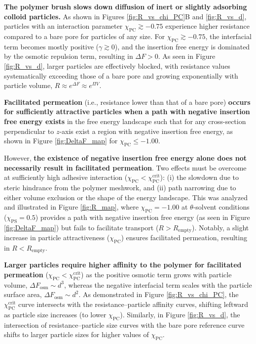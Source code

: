 \documentclass[12pt, a4paper]{article}
\begin{document}
\textbf{The polymer brush slows down diffusion of inert or slightly adsorbing colloid particles.}
As shown in Figures \ref{fig:R_vs_chi_PC}B and \ref{fig:R_vs_d}, particles with an interaction parameter $\chi_{\text{PC}} \gtrsim -0.75$ experience higher resistance compared to a bare pore for particles of any size.
For $\chi_{\text{PC}} \gtrsim -0.75$, the interfacial term becomes mostly positive ($\gamma \gtrsim 0$), and the insertion free energy is dominated by the osmotic repulsion term, resulting in $\Delta F > 0$.
As seen in Figure \ref{fig:R_vs_d}, larger particles are effectively blocked, with resistance values systematically exceeding those of a bare pore and growing exponentially with particle volume, $R \approx e^{\Delta F} \approx e^{\Pi V}$.

\textbf{Facilitated permeation} (i.e., resistance lower than that of a bare pore) \textbf{occurs for sufficiently attractive particles when a path with negative insertion free energy exists} in the free energy landscape such that for any cross-section perpendicular to $z$-axis exist a region with negative insertion free energy,
as shown in Figure \ref{fig:DeltaF_map} for $\chi_{\text{PC}} \le -1.00$.

However, \textbf{the existence of negative insertion free energy alone does not necessarily result in facilitated permeation}.
Two effects must be overcome at sufficiently high adhesive interaction ($\chi_{\text{PC}} < \chi^{\text{crit}}_{\text{PC}}$): (i) the slowdown due to steric hindrance from the polymer meshwork, and (ii) path narrowing due to either volume exclusion or the shape of the energy landscape.
This was analyzed and illustrated in Figure \ref{fig:R_map}, where $\chi_{\text{PC}} = -1.00$ at $\theta$-solvent conditions ($\chi_{\text{PS}} = 0.5$) provides a path with negative insertion free energy (as seen in Figure \ref{fig:DeltaF_map}) but fails to facilitate transport ($R > R_{\text{empty}}$).
Notably, a slight increase in particle attractiveness ($\chi_{\text{PC}}$) ensures facilitated permeation, resulting in $R < R_{\text{empty}}$.

\textbf{Larger particles require higher affinity to the polymer for facilitated permeation} ($\chi_{\text{PC}} < \chi^{\text{crit}}_{\text{PC}}$) as the positive osmotic term grows with particle volume, $\Delta F_{\text{osm}} \sim d^3$, whereas the negative interfacial term scales with the particle surface area, $\Delta F_{\text{osm}} \sim d^2$.
As demonstrated in Figure \ref{fig:R_vs_chi_PC}, the $\chi^{\text{crit}}_{\text{PC}}$ curve intersects with the resistance–particle affinity curves, shifting leftward as particle size increases (to lower $\chi_{\text{PC}}$).
Similarly, in Figure \ref{fig:R_vs_d}, the intersection of resistance–particle size curves with the bare pore reference curve shifts to larger particle sizes for higher values of $\chi_{\text{PC}}$.
\end{document}
